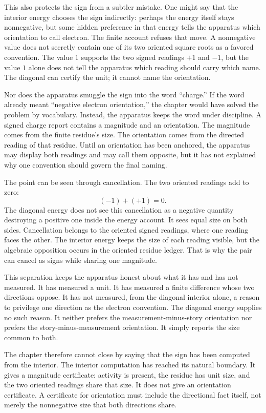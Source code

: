 This also protects the sign from a subtler mistake. One might say that the
interior energy chooses the sign indirectly: perhaps the energy itself stays
nonnegative, but some hidden preference in that energy tells the apparatus
which orientation to call electron. The finite account refuses that move. A
nonnegative value does not secretly contain one of its two oriented square
roots as a favored convention. The value \(1\) supports the two signed readings
\(+1\) and \(-1\), but the value \(1\) alone does not tell the apparatus which
reading should carry which name. The diagonal can certify the unit; it cannot
name the orientation.

Nor does the apparatus smuggle the sign into the word ``charge.'' If the word
already meant ``negative electron orientation,'' the chapter would have solved
the problem by vocabulary. Instead, the apparatus keeps the word under
discipline. A signed charge report contains a magnitude and an orientation. The
magnitude comes from the finite residue's size. The orientation comes from the
directed reading of that residue. Until an orientation has been anchored, the
apparatus may display both readings and may call them opposite, but it has not
explained why one convention should govern the final naming.

The point can be seen through cancellation. The two oriented readings add to
zero:
\[
  (-1) + (+1) = 0.
\]
The diagonal energy does not see this cancellation as a negative quantity
destroying a positive one inside the energy account. It sees equal size on both
sides. Cancellation belongs to the oriented signed readings, where one reading
faces the other. The interior energy keeps the size of each reading visible,
but the algebraic opposition occurs in the oriented residue ledger. That is why
the pair can cancel as signs while sharing one magnitude.

This separation keeps the apparatus honest about what it has and has not
measured. It has measured a unit. It has measured a finite difference whose two
directions oppose. It has not measured, from the diagonal interior alone, a
reason to privilege one direction as the electron convention. The diagonal
energy supplies no such reason. It neither prefers the measurement-minus-story
orientation nor prefers the story-minus-measurement orientation. It simply
reports the size common to both.

The chapter therefore cannot close by saying that the sign has been computed
from the interior. The interior computation has reached its natural boundary.
It gives a magnitude certificate: activity is present, the residue has unit
size, and the two oriented readings share that size. It does not give an
orientation certificate. A certificate for orientation must include the
directional fact itself, not merely the nonnegative size that both directions
share.

